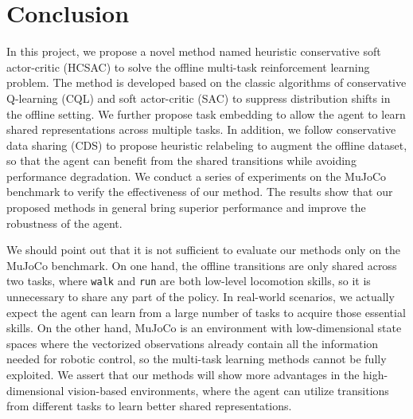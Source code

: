 \section{Conclusion}
\label{sec:conclusion}

In this project, we propose a novel method named heuristic conservative soft actor-critic (HCSAC) to solve the offline multi-task reinforcement learning problem. The method is developed based on the classic algorithms of conservative Q-learning (CQL) and soft actor-critic (SAC) to suppress distribution shifts in the offline setting. We further propose task embedding to allow the agent to learn shared representations across multiple tasks. In addition, we follow conservative data sharing (CDS) to propose heuristic relabeling to augment the offline dataset, so that the agent can benefit from the shared transitions while avoiding performance degradation. We conduct a series of experiments on the MuJoCo benchmark to verify the effectiveness of our method. The results show that our proposed methods in general bring superior performance and improve the robustness of the agent.

We should point out that it is not sufficient to evaluate our methods only on the MuJoCo benchmark. On one hand, the offline transitions are only shared across two tasks, where \texttt{walk} and \texttt{run} are both low-level locomotion skills, so it is unnecessary to share any part of the policy. In real-world scenarios, we actually expect the agent can learn from a large number of tasks to acquire those essential skills. On the other hand, MuJoCo is an environment with low-dimensional state spaces where the vectorized observations already contain all the information needed for robotic control, so the multi-task learning methods cannot be fully exploited. We assert that our methods will show more advantages in the high-dimensional vision-based environments, where the agent can utilize transitions from different tasks to learn better shared representations.
